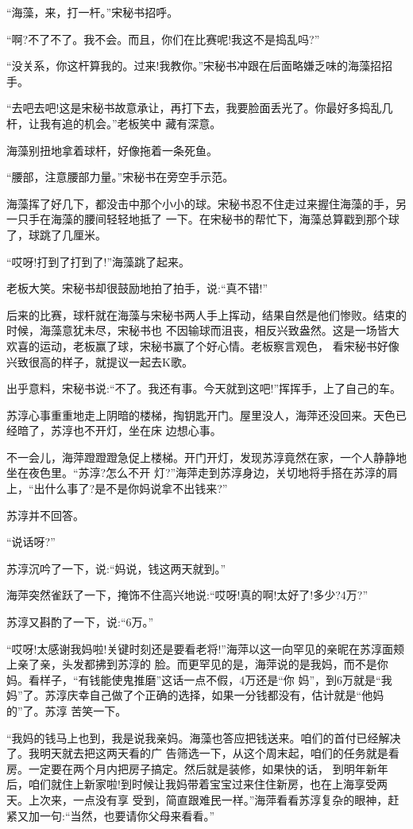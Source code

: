 \documentclass[11pt,a4paper,onecolumn]{article}
\begin{document}
``海藻，来，打一杆。''宋秘书招呼。

``啊?不了不了。我不会。而且，你们在比赛呢!我这不是捣乱吗?''

``没关系，你这杆算我的。过来!我教你。''宋秘书冲跟在后面略嫌乏味的海藻招招手。

``去吧去吧!这是宋秘书故意承让，再打下去，我要脸面丢光了。你最好多捣乱几杆，让我有追的机会。''老板笑中
藏有深意。

海藻别扭地拿着球杆，好像拖着一条死鱼。

``腰部，注意腰部力量。''宋秘书在旁空手示范。

海藻挥了好几下，都没击中那个小小的球。宋秘书忍不住走过来握住海藻的手，另一只手在海藻的腰间轻轻地抵了
一下。在宋秘书的帮忙下，海藻总算戳到那个球了，球跳了几厘米。

``哎呀!打到了打到了!''海藻跳了起来。

老板大笑。宋秘书却很鼓励地拍了拍手，说:``真不错!''

后来的比赛，球杆就在海藻与宋秘书两人手上挥动，结果自然是他们惨败。结束的时候，海藻意犹未尽，宋秘书也
不因输球而沮丧，相反兴致盎然。这是一场皆大欢喜的运动，老板赢了球，宋秘书赢了个好心情。老板察言观色，
看宋秘书好像兴致很高的样子，就提议一起去K歌。

出乎意料，宋秘书说:``不了。我还有事。今天就到这吧!''挥挥手，上了自己的车。

苏淳心事重重地走上阴暗的楼梯，掏钥匙开门。屋里没人，海萍还没回来。天色已经暗了，苏淳也不开灯，坐在床
边想心事。

不一会儿，海萍蹬蹬蹬急促上楼梯。开门开灯，发现苏淳竟然在家，一个人静静地坐在夜色里。``苏淳?怎么不开
灯?''海萍走到苏淳身边，关切地将手搭在苏淳的肩上，``出什么事了?是不是你妈说拿不出钱来?''

苏淳并不回答。

``说话呀?''

苏淳沉吟了一下，说:``妈说，钱这两天就到。''

海萍突然雀跃了一下，掩饰不住高兴地说:``哎呀!真的啊!太好了!多少?4万?''

苏淳又斟酌了一下，说:``6万。''

``哎呀!太感谢我妈啦!关键时刻还是要看老将!''海萍以这一向罕见的亲昵在苏淳面颊上亲了亲，头发都拂到苏淳的
脸。而更罕见的是，海萍说的是我妈，而不是你妈。看样子，``有钱能使鬼推磨''这话一点不假，4万还是``你
妈''，到6万就是``我妈''了。苏淳庆幸自己做了个正确的选择，如果一分钱都没有，估计就是``他妈的''了。苏淳
苦笑一下。

``我妈的钱马上也到，我是说我亲妈。海藻也答应把钱送来。咱们的首付已经解决了。我明天就去把这两天看的广
告筛选一下，从这个周末起，咱们的任务就是看房。一定要在两个月内把房子搞定。然后就是装修，如果快的话，
到明年新年后，咱们就住上新家啦!到时候让我妈带着宝宝过来住住新房，也在上海享受两天。上次来，一点没有享
受到，简直跟难民一样。''海萍看看苏淳复杂的眼神，赶紧又加一句:``当然，也要请你父母来看看。''
\end{document}
